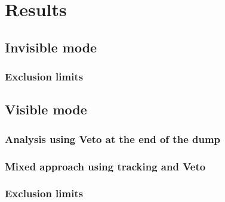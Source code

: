 
\chapter{Results} %

\label{chapter4} %


\section{Invisible mode}

\subsection{Exclusion limits}

\section{Visible mode}

\subsection{Analysis using Veto at the end of the dump}

\subsection{Mixed approach using tracking and Veto}

\subsection{Exclusion limits}

